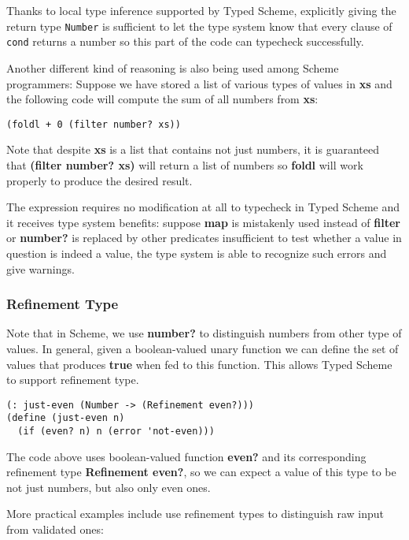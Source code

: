 Thanks to local type inference supported by Typed Scheme,
explicitly giving the return type \texttt{Number}
is sufficient to let the type system know that every clause of \texttt{cond} returns a number
so this part of the code can typecheck successfully.


Another different kind of reasoning is also being used among Scheme programmers:
Suppose we have stored a list of various types of values in \textbf{xs}
and the following code will compute the sum of all numbers from \textbf{xs}:

\begin{verbatim}
(foldl + 0 (filter number? xs))
\end{verbatim}

Note that despite \textbf{xs} is a list that contains not just numbers,
it is guaranteed that \textbf{(filter number? xs)} will return a list of numbers
so \textbf{foldl} will work properly to produce the desired result.

The expression requires no modification at all to typecheck in Typed Scheme
and it receives type system benefits: suppose \textbf{map} is mistakenly
used instead of \textbf{filter} or \textbf{number?} is replaced by
other predicates insufficient to test whether a value in question is indeed a value,
the type system is able to recognize such errors and give warnings.

\subsubsection{Refinement Type}

Note that in Scheme, we use \textbf{number?} to distinguish numbers
from other type of values.
In general, given a boolean-valued unary function
we can define the set of values that produces \textbf{true} when fed to this function.
This allows Typed Scheme to support refinement type.

\begin{verbatim}
(: just-even (Number -> (Refinement even?)))
(define (just-even n)
  (if (even? n) n (error 'not-even)))
\end{verbatim}

The code above uses boolean-valued function \textbf{even?}
and its corresponding refinement type \textbf{Refinement even?},
so we can expect a value of this type to be not just numbers, but also only even ones.

More practical examples include use refinement types to distinguish raw input
from validated ones:

